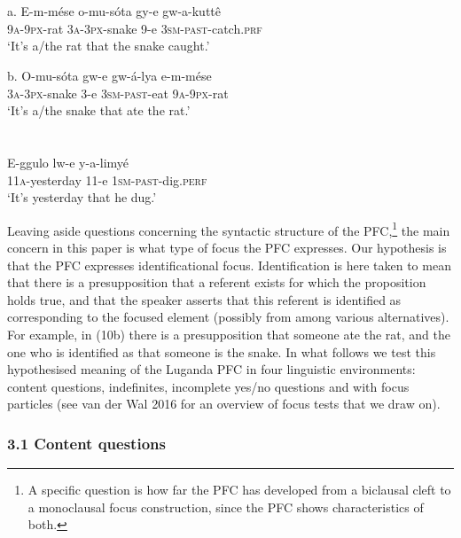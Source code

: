 \documentclass[output=paper]{langsci/langscibook}
\begin{document}
\chapter{}
\gll a.  E-m-mése  o-mu-sóta    gy-e  gw-a-kuttê{\textup{ }}\\
       \textsc{9a-9px}{}-rat  \textsc{3a}{}-\textsc{3px}{}-snake  9-e  \textsc{3sm}{}-\textsc{past}{}-catch.\textsc{prf}\\
\glt   ‘It’s a/the rat that the snake caught.’
\z

\gll b.  O-mu-sóta    gw-e  gw-á-lya    e-m-mése\\
       \textsc{3a-3px}{}-snake  3-e  \textsc{3sm-past}{}-eat  \textsc{9a-9px}{}-rat\\
\glt   ‘It’s a/the snake that ate the rat.’
\z

\chapter{}
\gll E-ggulo    lw-e  y-a-limyé\\
     11\textsc{a}{}-yesterday  11-e  \textsc{1sm}{}-\textsc{past}{}-dig.\textsc{perf}\\
\glt ‘It’s yesterday that he dug.’
\z

Leaving aside questions concerning the syntactic structure of the PFC,\footnote{ A specific question is how far the PFC has developed from a biclausal cleft to a monoclausal focus construction, since the PFC shows characteristics of both.}{ }the main concern in this paper is what type of focus the PFC expresses. Our hypothesis is that the PFC expresses identificational focus. Identification is here taken to mean that there is a presupposition that a referent exists for which the proposition holds true, and that the speaker asserts that this referent is identified as corresponding to the focused element (possibly from among various alternatives). For example, in (10b) there is a presupposition that someone ate the rat, and the one who is identified as that someone is the snake. In what follows we test this hypothesised meaning of the Luganda PFC in four linguistic environments: content questions, indefinites, incomplete yes/no questions and with focus particles (see van der Wal 2016 for an overview of focus tests that we draw on).

\subsection{ 3.1 Content questions}
\end{document}
